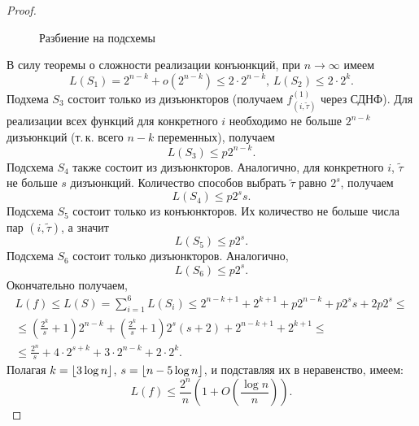 \begin{proof}
\begin{figure}[t]
        \caption{Разбиение на подсхемы}
    \end{figure}
    В силу теоремы о сложности реализации конъюнкций, при $n\to \infty$ имеем
    \[
        L(S_1) = 2^{n-k}+o(2^{n-k})\leqslant 2\cdot 2^{n-k},\, L(S_2) \leqslant 2\cdot2^k.
    \]
    Подхема $S_3$ состоит только из дизъюнкторов (получаем $f_{(i,\widetilde{\tau})}^{(1)}$ через СДНФ). Для реализации всех функций для конкретного $i$ необходимо не больше $2^{n-k}$ дизъюнкций (т.\,к. всего $n-k$ переменных), получаем
    \[
        L(S_3) \leqslant p2^{n-k}.
    \]
    Подсхема $S_4$ также состоит из дизъюнкторов. Аналогично, для конкретного $i$, $\widetilde{\tau}$ не больше $s$ дизъюнкций. Количество способов выбрать $\widetilde{\tau}$ равно $2^s$, получаем
    \[
        L(S_4) \leqslant p2^s s.
    \]
    Подсхема $S_5$ состоит только из конъюнкторов. Их количество не больше числа пар $(i, \widetilde{\tau})$, а значит
    \[
        L(S_5) \leqslant p 2^s.
    \]
    Подсхема $S_6$ состоит только дизъюнкторов. Аналогично, 
    \[
        L(S_6) \leqslant p2^s.
    \]
    Окончательно получаем, 
    \begin{multline*}
        L(f)\leqslant L(S) = \sum_{i=1}^6 L(S_i) \leqslant
        2^{n-k+1} + 2^{k+1} + p2^{n-k} + p2^ss+2p2^s \leqslant \\
        \leqslant \left(\frac{2^k}{s} + 1\right)2^{n-k}+\left(\frac{2^k}{s} + 1\right)2^s(s+2) + 2^{n-k+1} + 2^{k+1} \leqslant \\
        \leqslant \frac{2^n}{s} + 4\cdot 2^{s+k} + 3\cdot2^{n-k}+2\cdot2^k.
    \end{multline*}
    Полагая $k=\left\lfloor 3\log n \right\rfloor$, $s = \left\lfloor n - 5\log n \right\rfloor$, и подставляя их в неравенство, имеем:
    \[
        L(f) \leqslant \frac{2^n}{n}\left(1+O\left(\frac{\log n}{n}\right)\right).
    \]
\end{proof}